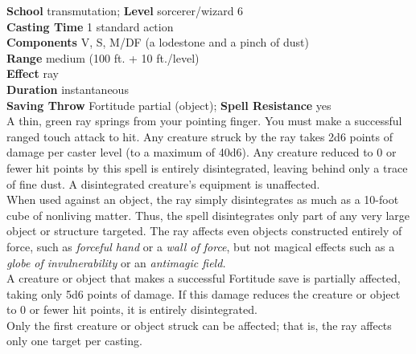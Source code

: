\textbf{School} transmutation; \textbf{Level} sorcerer/wizard 6\\
\textbf{Casting Time} 1 standard action\\
\textbf{Components} V, S, M/DF (a lodestone and a pinch of dust)\\
\textbf{Range }medium (100 ft. + 10 ft./level)\\
\textbf{Effect} ray\\
\textbf{Duration} instantaneous\\
\textbf{Saving Throw} Fortitude partial (object); \textbf{Spell Resistance} yes\\
A thin, green ray springs from your pointing finger. You must make a successful ranged touch attack to hit. Any creature struck by the ray takes 2d6 points of damage per caster level (to a maximum of 40d6). Any creature reduced to 0 or fewer hit points by this spell is entirely disintegrated, leaving behind only a trace of fine dust. A disintegrated creature's equipment is unaffected.\\
When used against an object, the ray simply disintegrates as much as a 10-foot cube of nonliving matter. Thus, the spell disintegrates only part of any very large object or structure targeted. The ray affects even objects constructed entirely of force, such as \textit{forceful hand }or a \textit{wall of force}, but not magical effects such as a \textit{globe of invulnerability }or an \textit{antimagic field.}\\
A creature or object that makes a successful Fortitude save is partially affected, taking only 5d6 points of damage. If this damage reduces the creature or object to 0 or fewer hit points, it is entirely disintegrated.\\
Only the first creature or object struck can be affected; that is, the ray affects only one target per casting.\\
